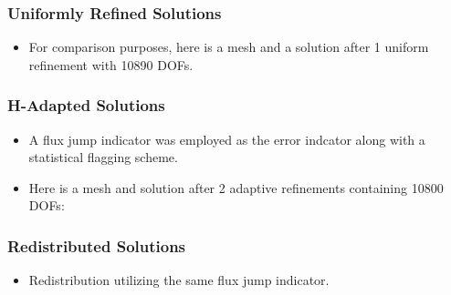 \frame
{
  \frametitle{Uniformly Refined Solutions}
  \begin{itemize}[<+->]
  \item For comparison purposes, here is a mesh and a solution after 1 uniform refinement with 10890 DOFs.
    \begin{figure}[!htb]
      \begin{center}
      \end{center}
    \end{figure}
  \end{itemize}
}

\frame
{
  \frametitle{H-Adapted Solutions}
  \begin{itemize}[<+->]
    \item A flux jump indicator was employed as the error indcator along with a statistical flagging scheme.
    \item Here is a mesh and solution after 2 adaptive refinements containing 10800 DOFs:
      \begin{figure}[!htb]
        \begin{center}
        \end{center}
      \end{figure}
  \end{itemize}
}

\frame
{
  \frametitle{Redistributed Solutions}
  \begin{itemize}[<+->]
    \item Redistribution utilizing the same flux jump indicator.
      \begin{figure}[!htb]
        \begin{center}
        \end{center}
      \end{figure}
  \end{itemize}
}

